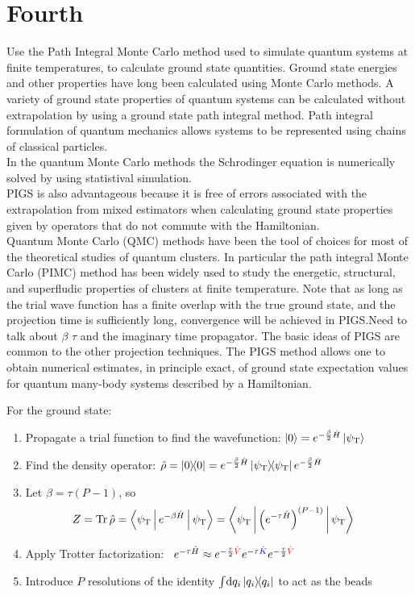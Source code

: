 \documentclass[12pt,letterpaper,oneside,final,titlepage]{article}               %
\numberwithin{equation}{section} %
\newcommand{\psiT}{\psi_{\textrm{T}}}
\DeclareMathOperator{\Tr}{Tr}
\begin{document}
\section{Fourth}
 Use the Path Integral Monte Carlo method used to simulate quantum systems at finite temperatures, to calculate ground state quantities. Ground state energies and other properties have long been calculated using Monte Carlo methods. A variety of ground state properties of quantum systems can be calculated without extrapolation by using a ground state path integral method. Path integral formulation of quantum mechanics allows systems to be represented using chains of classical particles. \\
In the quantum Monte Carlo methods the Schrodinger equation is numerically solved by using statistival simulation. \\
PIGS is also advantageous because it is free of errors associated with the extrapolation from mixed estimators when calculating ground state properties given by operators that do not commute with the Hamiltonian. \\
Quantum Monte Carlo (QMC) methods have been the tool of choices for most of the theoretical studies of quantum clusters. In particular the path integral Monte Carlo (PIMC) method has been widely used to study the energetic, structural, and superfludic properties of clusters at finite temperature. Note that as long as the trial wave function has a finite overlap with the true ground state, and the projection time is sufficiently long, convergence will be achieved in PIGS.Need to talk about $\beta$ $\tau$ and the imaginary time propagator.
The basic ideas of PIGS are common to the other projection techniques. The PIGS method allows one to obtain numerical estimates, in principle exact, of ground state expectation values for quantum many-body systems described by a Hamiltonian.


For the ground state:
\begin{enumerate}\setlength{\itemindent}{1em}
	\item Propagate a trial function to find the wavefunction: $\ket{0} = e^{-\frac{\beta}{2} \hat{H}} \ket{\psiT}$
	\item Find the density operator: $\hat{\rho} = \ket{0}\!\!\bra{0} = e^{-\frac{\beta}{2} \hat{H}} \ket{\psiT}\!\!\bra{\psiT} e^{-\frac{\beta}{2} \hat{H}}$
	\item Let $\beta = \tau (P-1)$, so
		\begin{align*}
			Z
			&= \Tr{\hat{\rho}}
			= \Braket{\psiT | e^{-\beta \hat{H}} | \psiT}
			= \Braket{\psiT | \left( e^{-\tau \hat{H}} \right)^{(P-1)} | \psiT}
		\end{align*}
	\item Apply Trotter factorization:~\cite{schmidt2014inclusion}
		$
			e^{-\tau \hat{H}}
			\approx
				e^{-\frac{\tau}{2} \textcolor{red}{\hat{V}}}
				e^{-\tau \textcolor{blue}{\hat{K}}}
				e^{-\frac{\tau}{2} \textcolor{red}{\hat{V}}}
		$
	\item Introduce $P$ resolutions of the identity $\int\! \dif q_i \ket{q_i}\!\!\bra{q_i}$ to act as the beads
\end{enumerate}
\end{document}
